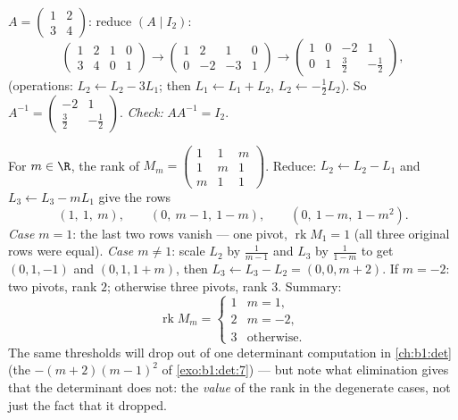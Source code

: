 \begin{example}\label{ex:b1:matrices:inverse}
$A = \begin{pmatrix} 1 & 2 \\ 3 & 4 \end{pmatrix}$: reduce $(A \mid
I_2)$:
\[
\begin{pmatrix} 1 & 2 & 1 & 0\\ 3 & 4 & 0 & 1 \end{pmatrix}
\to
\begin{pmatrix} 1 & 2 & 1 & 0\\ 0 & -2 & -3 & 1 \end{pmatrix}
\to
\begin{pmatrix} 1 & 0 & -2 & 1\\ 0 & 1 & \tfrac32 & -\tfrac12
\end{pmatrix},
\]
(operations: $L_2 \leftarrow L_2 - 3L_1$; then $L_1 \leftarrow L_1
+ L_2$, $L_2 \leftarrow -\frac12 L_2$). So $A^{-1} =
\begin{pmatrix} -2 & 1 \\ \tfrac32 & -\tfrac12\end{pmatrix}$.
\emph{Check:} $AA^{-1} = I_2$.
\end{example}

\begin{example}
\label{ex:b1:matrices:rankparameter}
For $m \in \R$, the rank of
$M_m = \begin{pmatrix} 1 & 1 & m\\ 1 & m & 1\\ m & 1 &
1\end{pmatrix}$. Reduce: $L_2 \leftarrow L_2 - L_1$ and $L_3
\leftarrow L_3 - mL_1$ give the rows
\[
(1,\ 1,\ m), \qquad (0,\ m - 1,\ 1 - m), \qquad
(0,\ 1 - m,\ 1 - m^2).
\]
\emph{Case $m = 1$}: the last two rows vanish --- one pivot,
$\operatorname{rk} M_1 = 1$ (all three original rows were
equal). \emph{Case $m \neq 1$}: scale $L_2$ by $\frac1{m-1}$ and
$L_3$ by $\frac1{1-m}$ to get $(0, 1, -1)$ and $(0, 1, 1 + m)$,
then $L_3 \leftarrow L_3 - L_2 = (0, 0, m + 2)$. If $m = -2$:
two pivots, rank $2$; otherwise three pivots, rank $3$. Summary:
\[
\operatorname{rk} M_m =
\begin{cases}
1 & m = 1,\\
2 & m = -2,\\
3 & \text{otherwise}.
\end{cases}
\]
The same thresholds will drop out of one determinant computation
in \cref{ch:b1:det} (the  $-(m+2)(m-1)^2$ of
\cref{exo:b1:det:7}) --- but note what elimination gives that
the determinant does not: the \emph{value} of the rank in the
degenerate cases, not just the fact that it dropped.
\end{example}

